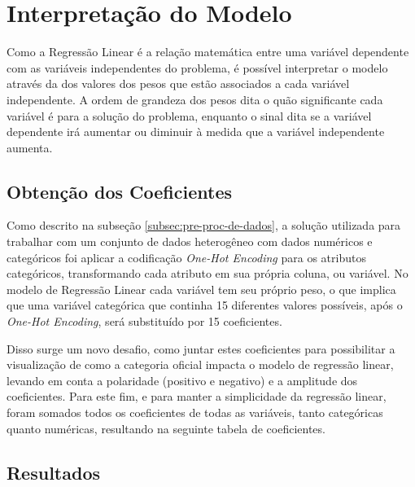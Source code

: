 \documentclass{report}
\let\oldsection\section
\renewcommand\section{\clearpage\oldsection}
\begin{document}
\section{Interpretação do Modelo}

Como a Regressão Linear é a relação matemática entre uma variável dependente com as variáveis independentes do problema, é possível interpretar o modelo através da dos valores dos pesos que estão associados a cada variável independente. A ordem de grandeza dos pesos dita o quão significante cada variável é para a solução do problema, enquanto o sinal dita se a variável dependente irá aumentar ou diminuir à medida que a variável independente aumenta.

\subsection{Obtenção dos Coeficientes}

Como descrito na subseção \ref{subsec:pre-proc-de-dados}, a solução utilizada para trabalhar com um conjunto de dados heterogêneo com dados numéricos e categóricos foi aplicar a codificação \textit{One-Hot Encoding} para os atributos categóricos, transformando cada atributo em sua própria coluna, ou variável. No modelo de Regressão Linear cada variável tem seu próprio peso, o que implica que uma variável categórica que continha 15 diferentes valores possíveis, após o \textit{One-Hot Encoding}, será substituído por 15 coeficientes.

Disso surge um novo desafio, como juntar estes coeficientes para possibilitar a visualização de como a categoria oficial impacta o modelo de regressão linear, levando em conta a polaridade (positivo e negativo) e a amplitude dos coeficientes. Para este fim, e para manter a simplicidade da regressão linear, foram somados todos os coeficientes de todas as variáveis, tanto categóricas quanto numéricas, resultando na seguinte tabela de coeficientes.

\subsection{Resultados}
\end{document}
